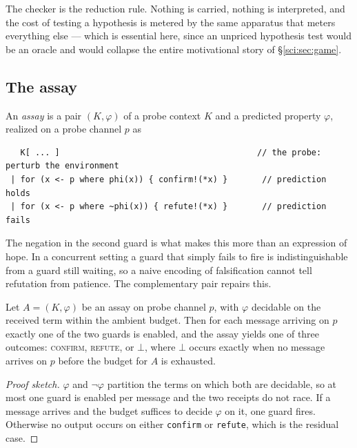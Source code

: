The checker is the reduction rule. Nothing is carried, nothing is interpreted, and the cost of testing
a hypothesis is metered by the same apparatus that meters everything else --- which is essential here,
since an unpriced hypothesis test would be an oracle and would collapse the entire motivational story
of \S\ref{sci:sec:game}.

\subsection{The assay}\label{sci:S4.2}

\begin{definition}[Assay]
\label{sci:def:assay}
An \emph{assay} is a pair $(K, \varphi)$ of a probe context $K$ and a predicted property $\varphi$,
realized on a probe channel $p$ as
\begin{lstlisting}
   K[ ... ]                                        // the probe: perturb the environment
 | for (x <- p where phi(x)) { confirm!(*x) }       // prediction holds
 | for (x <- p where ~phi(x)) { refute!(*x) }       // prediction fails
\end{lstlisting}
\end{definition}

The negation in the second guard is what makes this more than an expression of hope. In a concurrent
setting a guard that simply fails to fire is indistinguishable from a guard still waiting, so a naive
encoding of falsification cannot tell refutation from patience. The complementary pair repairs this.

\begin{proposition}[Trichotomy]
\label{sci:prop:trichotomy}
Let $A = (K,\varphi)$ be an assay on probe channel $p$, with $\varphi$ decidable on the received term
within the ambient budget. Then for each message arriving on $p$ exactly one of the two guards is
enabled, and the assay yields one of three outcomes: \textsc{confirm}, \textsc{refute}, or $\bot$,
where $\bot$ occurs exactly when no message arrives on $p$ before the budget for $A$ is exhausted.
\end{proposition}

\begin{proof}[Proof sketch]
$\varphi$ and $\lnot\varphi$ partition the terms on which both are decidable, so at most one guard is
enabled per message and the two receipts do not race. If a message arrives and the budget suffices to
decide $\varphi$ on it, one guard fires. Otherwise no output occurs on either \texttt{confirm} or
\texttt{refute}, which is the residual case.
\end{proof}


